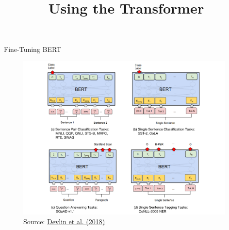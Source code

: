 



\newcommand{\titlefigure}{figure/bert.jpeg}
\newcommand{\learninggoals}{
\item Understand the fine-tuning procedure
\item Learn the differences between token- and sequence classification}

\title{Using the Transformer}
\date{}




\begin{frame}{Fine-Tuning BERT}
	\begin{figure}
	\centering
		\includegraphics[width = 11cm]{figure/bert-finetune.png}\\ 
		\footnotesize{Source:} \href{https://arxiv.org/pdf/1810.04805.pdf}{\footnotesize Devlin et al. (2018)}
	\end{figure}
\end{frame}



